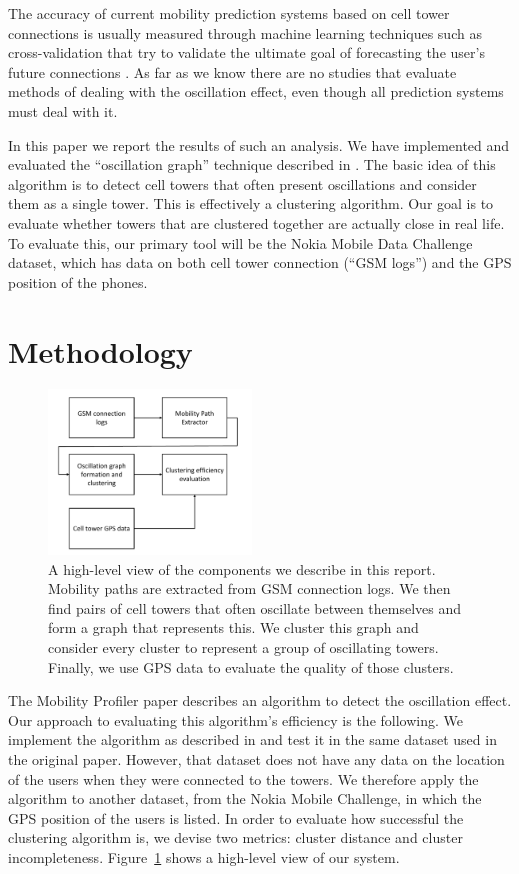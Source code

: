 \documentclass[letterpaper, 12pt, conference]{ieeeconf}
\begin{document}
The accuracy of current mobility prediction systems based on cell tower 
connections is usually measured through machine learning techniques such as cross-validation that try to validate the ultimate goal of forecasting the user's 
future connections \cite{LeapGraph}. As far as we know there are no studies 
that evaluate methods of dealing with the oscillation effect, even though all 
prediction systems must deal with it.

In this paper we report the results of such an analysis. We have implemented 
and evaluated the ``oscillation graph'' technique described in \cite{
mobilityprofiler}. The basic idea of this algorithm is to detect cell towers 
that often present oscillations and consider them as a single tower. This is 
effectively a clustering algorithm. Our goal is to evaluate whether towers 
that are clustered together are actually close in real life. To evaluate 
this, our primary tool will be the Nokia Mobile Data Challenge dataset, which has data on both 
cell tower connection (``GSM logs'') and the GPS position of the phones.

\section{Methodology}
\label{sec:methodology}

\begin{figure}
\centering
\includegraphics[width=0.48\textwidth]{figs/box_diagram}
\caption{A high-level view of the components we describe in this report. Mobility paths are extracted from GSM connection logs. We then find pairs of cell towers that often oscillate between themselves and form a graph that represents this. We cluster this graph and consider every cluster to represent a group of oscillating towers. Finally, we use GPS data to evaluate the quality of those clusters.}
\label{fig:box_diagram}
\end{figure}

The Mobility Profiler paper \cite{mobilityprofiler} describes an algorithm to 
detect the oscillation effect. Our approach to evaluating this algorithm's 
efficiency is the following. We implement the algorithm as described in \cite
{mobilityprofiler} and test it in the same dataset used in the original 
paper. However, that dataset does not have any data on the location of the 
users when they were connected to the towers. We therefore apply the 
algorithm to another dataset, from the Nokia Mobile Challenge, in which the 
GPS position of the users is listed. In order to evaluate how successful the 
clustering algorithm is, we devise two metrics: cluster distance and cluster 
incompleteness. Figure~\ref{fig:box_diagram} shows a high-level view of our system.
\end{document}
